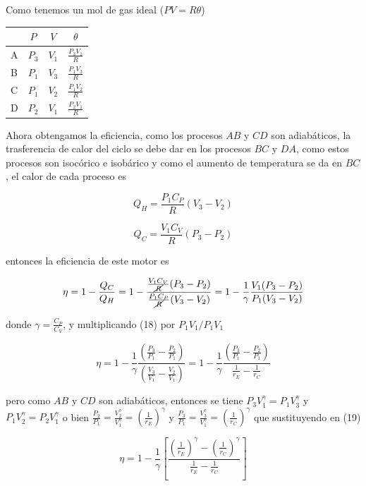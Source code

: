 \documentclass[12pt,a4paper]{article}
\begin{document}
\begin{enumerate}
    Como tenemos un mol de gas ideal ($PV = R\theta$)
    
    \begin{table}[h!]
        \centering
        \begin{tabular}{|l|c|c|c|}
        \hline
           & $P$ & $V$ & $\theta$ \\ \hline
            A & $P_3$ & $V_1$ & $\frac{P_3 V_1}{R}$\\
            B & $P_1$ & $V_3$ & $\frac{P_1 V_3}{R}$\\
            C & $P_1$ & $V_2$ & $\frac{P_1 V_2}{R}$\\
            D & $P_2$ & $V_1$ & $\frac{P_2 V_1}{R}$ \\ \hline
        \end{tabular}
    \end{table}
\end{enumerate}

Ahora obtengamos la eficiencia, como los procesos $AB$ y $CD$ son adiabáticos, la trasferencia de calor del ciclo se debe dar en los procesos $BC$ y $DA$, como estos procesos son isocórico e isobárico y como el aumento de temperatura se da en $BC$, el calor de cada proceso es

\begin{equation}
  Q_{H} = \frac{P_1 C_{P}}{R} ( V_3 - V_2)  
\end{equation}

\begin{equation}
    Q_{C} = \frac{V_1 C_V}{R} (P_3 - P_2)
\end{equation}

entonces la eficiencia de este motor es

\begin{equation}
    \eta = 1 - \frac{Q_C}{Q_H} = 1 - \frac{\frac{V_1 C_V}{\cancel{R}} (P_3 - P_2)}{ \frac{P_1 C_{P}}{\cancel{R}} ( V_3 - V_2)} = 1 -\frac{1}{\gamma} \frac{V_1(P_3 - P_2)}{P_1(V_3 - V_2)}
\end{equation}

donde $\gamma = \frac{C_P}{C_V}$, y multiplicando (18) por $P_1 V_1 /P_1 V_1$

\begin{equation}
    \eta = 1 -\frac{1}{\gamma} \frac{(\frac{P_3}{P_1} - \frac{P_2}{P_1})}{(\frac{V_3}{V_1} - \frac{V_2}{V_1})} = 1 - \frac{1}{\gamma} \frac{(\frac{P_3}{P_1} - \frac{P_2}{P_1})}{\frac{1}{r_E} - \frac{1}{r_C}}
\end{equation}

pero como $AB$ y $CD$ son adiabáticos, entonces se tiene $P_3 V_{1}^{\gamma}= P_1 V_{3}^{\gamma}$ y $P_1 V_{2}^{\gamma} = P_{2} V_{1}^{\gamma}$ o bien $\frac{P_2}{P_1} = \frac{V_{2}^{\gamma}}{V_{1}^{\gamma}} =  (\frac{1}{r_E}) ^{\gamma}$ y $\frac{P_3}{P_1} = \frac{V_{3}^{\gamma}}{V_{1}^{\gamma}} = (\frac{1}{r_C})^{\gamma}$ que sustituyendo en (19)

\begin{equation*}
    \eta = 1 - \frac{1}{\gamma} \left[\frac{\left(\frac{1}{r_E}\right)^{\gamma} - \left(\frac{1}{r_C}\right)^{\gamma}}{\frac{1}{r_E} - \frac{1}{r_C}}\right]
\end{equation*}
\end{document}
